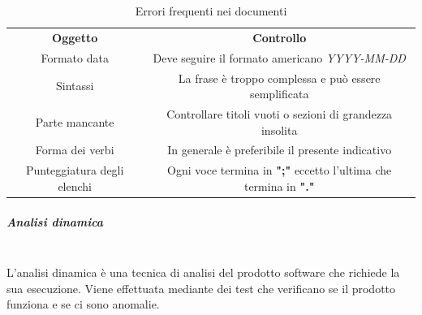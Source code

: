 			\begin{table}[H]
				\centering\renewcommand{\arraystretch}{1.5}
				\caption{Errori frequenti nei documenti}
				\begin{tabular}{c|c}
					
					\rowcolorhead
					{ \textbf{Oggetto}} &
					{ \textbf{Controllo} }\\
					
					\rowcolorlight
					{\colorbody Formato data} & { Deve seguire il formato americano \textit{YYYY-MM-DD}} 
					\\
					
					\rowcolordark
					{\colorbody Sintassi} & {  La frase è troppo complessa e può essere semplificata } 
					\\	
					
					\rowcolorlight
					{\colorbody Parte mancante} & { Controllare titoli vuoti o sezioni di grandezza insolita} 
					\\
					
					\rowcolordark
					{\colorbody Forma dei verbi} & { In generale è preferibile il presente indicativo} 
					\\
					
					\rowcolorlight
					{ Punteggiatura degli elenchi} & { Ogni voce termina in \textbf{";"} eccetto l'ultima che termina in \textbf{"."}} 
					\\
				\end{tabular}
			\end{table}
														
			\subparagraph{Analisi dinamica} \mbox{}\\
			L’analisi dinamica è una tecnica di analisi del prodotto software che richiede la sua esecuzione. Viene effettuata  mediante dei test che verificano se il prodotto funziona e se ci sono anomalie. 
			
